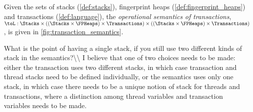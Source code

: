 \begin{defn}
Given the sets of stacks (\ref{def:stacks}), fingerprint heaps (\ref{def:fingerprint_heaps}) and transactions (\ref{def:language}), the \emph{operational semantics of transactions}, $\toL : \Stacks \times ((\Stacks \times \FPHeaps) \times \Transactions) \times ((\Stacks \times \FPHeaps) \times \Transactions)$, is given in \fig\ref{fig:transaction_semantics}.
\end{defn}
\ac{What is the point of having a single stack, if you still use two different kinds of stack in the semantics?\\
I believe that one of two choices needs to be made: either the transaction uses two different stacks, in which case transaction and thread stacks need to be 
defined individually, or the semantics uses only one stack, in which case there needs to be a unique notion of stack for threads and transactions, 
where a distinction among thread variables and transaction variables needs to be made.}

